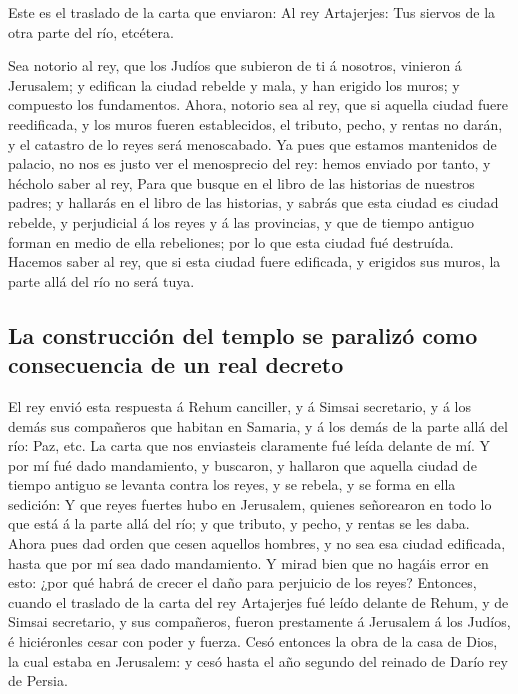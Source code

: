  Este es el traslado de la carta que enviaron: Al rey
Artajerjes: Tus siervos de la otra parte del río, etcétera.

 Sea notorio al rey, que los Judíos que subieron de ti á
nosotros, vinieron á Jerusalem; y edifican la ciudad rebelde y mala, y
han erigido los muros; y compuesto los fundamentos.  Ahora,
notorio sea al rey, que si aquella ciudad fuere reedificada, y los muros
fueren establecidos, el tributo, pecho, y rentas no darán, y el catastro
de lo reyes será menoscabado.  Ya pues que estamos
mantenidos de palacio, no nos es justo ver el menosprecio del rey: hemos
enviado por tanto, y hécholo saber al rey,  Para que busque
en el libro de las historias de nuestros padres; y hallarás en el libro
de las historias, y sabrás que esta ciudad es ciudad rebelde, y
perjudicial á los reyes y á las provincias, y que de tiempo antiguo
forman en medio de ella rebeliones; por lo que esta ciudad fué
destruída.  Hacemos saber al rey, que si esta ciudad fuere
edificada, y erigidos sus muros, la parte allá del río no será tuya.

\hypertarget{la-construcciuxf3n-del-templo-se-paralizuxf3-como-consecuencia-de-un-real-decreto}{%
\subsection{La construcción del templo se paralizó como consecuencia de
un real
decreto}\label{la-construcciuxf3n-del-templo-se-paralizuxf3-como-consecuencia-de-un-real-decreto}}

 El rey envió esta respuesta á Rehum canciller, y á Simsai
secretario, y á los demás sus compañeros que habitan en Samaria, y á los
demás de la parte allá del río: Paz, etc.  La carta que nos
enviasteis claramente fué leída delante de mí.  Y por mí
fué dado mandamiento, y buscaron, y hallaron que aquella ciudad de
tiempo antiguo se levanta contra los reyes, y se rebela, y se forma en
ella sedición:  Y que reyes fuertes hubo en Jerusalem,
quienes señorearon en todo lo que está á la parte allá del río; y que
tributo, y pecho, y rentas se les daba.  Ahora pues dad
orden que cesen aquellos hombres, y no sea esa ciudad edificada, hasta
que por mí sea dado mandamiento.  Y mirad bien que no
hagáis error en esto: ¿por qué habrá de crecer el daño para perjuicio de
los reyes?  Entonces, cuando el traslado de la carta del
rey Artajerjes fué leído delante de Rehum, y de Simsai secretario, y sus
compañeros, fueron prestamente á Jerusalem á los Judíos, é hiciéronles
cesar con poder y fuerza.  Cesó entonces la obra de la casa
de Dios, la cual estaba en Jerusalem: y cesó hasta el año segundo del
reinado de Darío rey de Persia.

